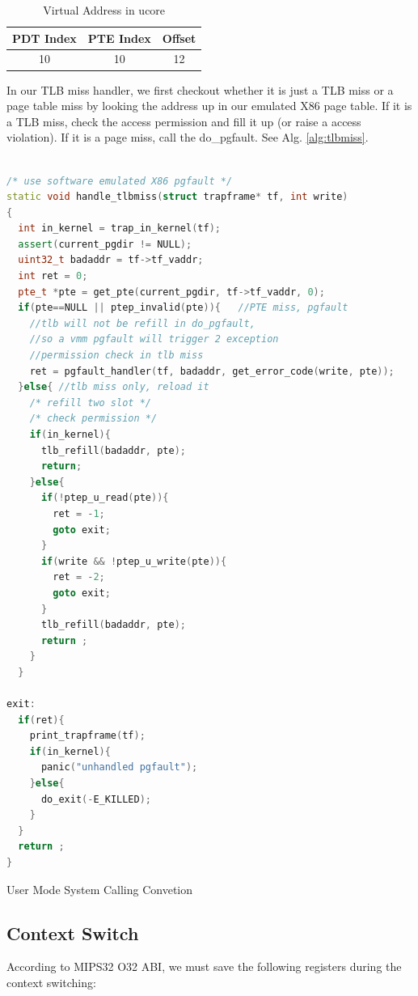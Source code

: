 \documentclass[a4paper]{article}
\begin{document}
\begin{table}[H]
\centering
\begin{tabular}{|c|c|c|}
\hline
PDT Index & PTE Index & Offset \\
\hline
10 & 10 & 12 \\
\hline
\end{tabular}
\caption{Virtual Address in ucore}
\label{tab:va_layout}
\end{table}

In our TLB miss handler, we first checkout whether it is just a TLB miss
or a page table miss by looking the address up in our emulated X86 page table.
If it is a TLB miss, check the access permission and fill it up (or raise a
access violation). If it is a page miss, call the do\_pgfault. See Alg. \ref{alg:tlbmiss}.


\begin{algorithm}[h]

 \begin{lstlisting}[language={C++}]

/* use software emulated X86 pgfault */
static void handle_tlbmiss(struct trapframe* tf, int write)
{
  int in_kernel = trap_in_kernel(tf);
  assert(current_pgdir != NULL);
  uint32_t badaddr = tf->tf_vaddr;
  int ret = 0;
  pte_t *pte = get_pte(current_pgdir, tf->tf_vaddr, 0);
  if(pte==NULL || ptep_invalid(pte)){   //PTE miss, pgfault
    //tlb will not be refill in do_pgfault,
    //so a vmm pgfault will trigger 2 exception
    //permission check in tlb miss
    ret = pgfault_handler(tf, badaddr, get_error_code(write, pte));
  }else{ //tlb miss only, reload it
    /* refill two slot */
    /* check permission */
    if(in_kernel){
      tlb_refill(badaddr, pte); 
      return;
    }else{
      if(!ptep_u_read(pte)){
        ret = -1;
        goto exit;
      }
      if(write && !ptep_u_write(pte)){
        ret = -2;
        goto exit;
      }
      tlb_refill(badaddr, pte);
      return ;
    }
  }

exit:
  if(ret){
    print_trapframe(tf);
    if(in_kernel){
      panic("unhandled pgfault");
    }else{
      do_exit(-E_KILLED);
    }
  }
  return ;
}

\end{lstlisting}
\caption{User Mode System Calling Convetion}
\label{alg:tlbmiss}
\end{algorithm}

\subsection{Context Switch}
According to MIPS32 O32 ABI, we must save the following registers
during the context switching:
\end{document}
